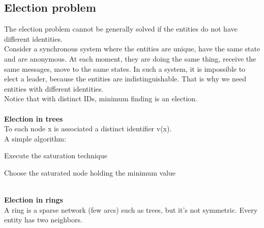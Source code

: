 \documentclass[paper=a4, fontsize=11pt]{scrartcl} %
\numberwithin{equation}{section} %
\numberwithin{figure}{section} %
\numberwithin{table}{section} %
\begin{document}
\subsection*{Election problem}
The election problem cannot be generally solved if the entities do not have different identities.\\
Consider a synchronous system where the entities are unique, have the same state and are anonymous.
At each moment, they are doing the same thing, receive the same messages, move to the same states. In such a system, it is impossible to elect a leader, because the entities are indistinguishable. That is why we need entities with different identities.\\
Notice that with distinct IDs, minimum finding is an election.
\\ ~ \\
\textbf{Election in trees}\\
To each node x is associated a distinct identifier v(x). \\ A simple algorithm:
\begin{compactitem}
\item Execute the saturation technique
\item Choose the saturated node holding the minimum value
\end{compactitem} ~ \\ 
\textbf{Election in rings}\\
A ring is a sparse network (few arcs) such as trees, but it's not symmetric. Every entity has two neighbors.
\clearpage
\end{document}
